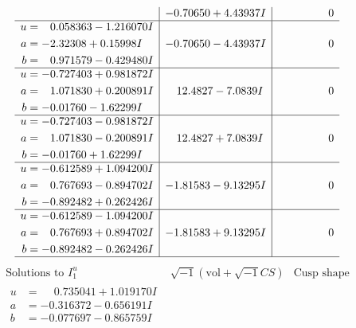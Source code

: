 \documentclass[1p]{elsarticle_modified}
\theoremstyle{definition}
\newcommand{\I}{\sqrt{-1}}
\begin{document}
$$\begin{array}{c|c|c}
 & -0.70650 + 4.43937 I & \phantom{-0.000000 } 0 \\ \hline\begin{aligned}
u &= \phantom{-}0.058363 - 1.216070 I \\
a &= -2.32308 + 0.15998 I \\
b &= \phantom{-}0.971579 - 0.429480 I\end{aligned}
 & -0.70650 - 4.43937 I & \phantom{-0.000000 } 0 \\ \hline\begin{aligned}
u &= -0.727403 + 0.981872 I \\
a &= \phantom{-}1.071830 + 0.200891 I \\
b &= -0.01760 - 1.62299 I\end{aligned}
 & \phantom{-}12.4827 - 7.0839 I & \phantom{-0.000000 } 0 \\ \hline\begin{aligned}
u &= -0.727403 - 0.981872 I \\
a &= \phantom{-}1.071830 - 0.200891 I \\
b &= -0.01760 + 1.62299 I\end{aligned}
 & \phantom{-}12.4827 + 7.0839 I & \phantom{-0.000000 } 0 \\ \hline\begin{aligned}
u &= -0.612589 + 1.094200 I \\
a &= \phantom{-}0.767693 - 0.894702 I \\
b &= -0.892482 + 0.262426 I\end{aligned}
 & -1.81583 - 9.13295 I & \phantom{-0.000000 } 0 \\ \hline\begin{aligned}
u &= -0.612589 - 1.094200 I \\
a &= \phantom{-}0.767693 + 0.894702 I \\
b &= -0.892482 - 0.262426 I\end{aligned}
 & -1.81583 + 9.13295 I & \phantom{-0.000000 } 0\\
 \hline 
 \end{array}$$\newpage$$\begin{array}{c|c|c}  
\text{Solutions to }I^u_{1}& \I (\text{vol} + \sqrt{-1}CS) & \text{Cusp shape}\\
 \hline 
\begin{aligned}
u &= \phantom{-}0.735041 + 1.019170 I \\
a &= -0.316372 - 0.656191 I \\
b &= -0.077697 - 0.865759 I\end{aligned}

\end{array}$$
\end{document}
